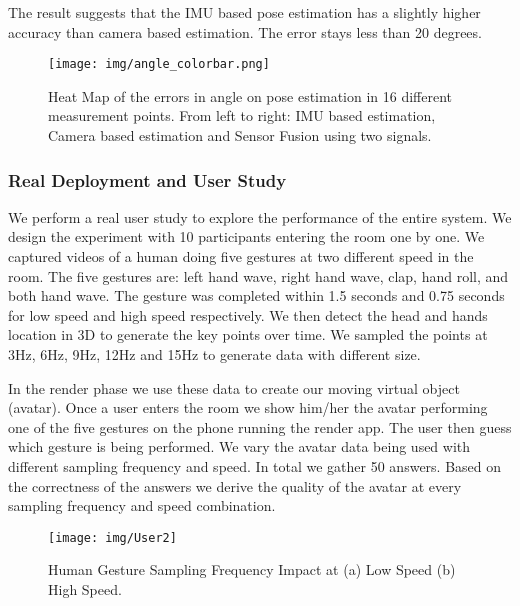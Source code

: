 The result suggests that the IMU based pose estimation has a slightly higher accuracy than camera based estimation. The error stays less than 20 degrees.

\begin{figure}[!htb]
	\begin{center}
		\texttt{[image: img/angle\_colorbar.png]}
		\caption{Heat Map of the errors in angle on pose estimation in 16 different measurement points. From left to right: IMU based estimation, Camera based estimation and Sensor Fusion using two signals.}
		\label{fig:angle_heatmap}
	\end{center}
	\vspace{-1.5em}
\end{figure}

\subsubsection{Real Deployment and User Study}

We perform a real user study to explore the performance of the entire system. We design the experiment with 10 participants entering the room one by one. We captured videos of a human doing five gestures at two different speed in the room. The five gestures are: left hand wave, right hand wave, clap, hand roll, and both hand wave. The gesture was completed within 1.5 seconds and 0.75 seconds for low speed and high speed respectively. We then detect the head and hands location in 3D to generate the key points over time. We sampled the points at 3Hz, 6Hz, 9Hz, 12Hz and 15Hz to generate data with different size.

In the render phase we use these data to create our moving virtual object (avatar). Once a user enters the room we show him/her the avatar performing one of the five gestures on the phone running the render app. The user then guess which gesture is being performed. We vary the avatar data being used with different sampling frequency and speed. In total we gather 50 answers. Based on the correctness of the answers we derive the quality of the avatar at every sampling frequency and speed combination.

\begin{figure}[!htb]
	\begin{center}
		\texttt{[image: img/User2]}
		\caption{Human Gesture Sampling Frequency Impact at (a) Low Speed (b) High Speed.}
		\label{fig:user}
	\end{center}
\end{figure}

